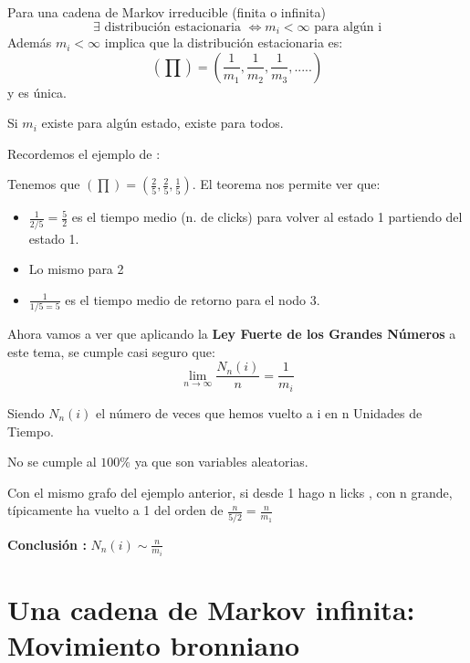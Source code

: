 	\begin{theorem}[Teorema 4]
		\label{Markov_tma4}
		Para una cadena de Markov irreducible (finita o infinita)
		$$\exists \text{ distribución estacionaria } \iff m_i <\infty \text{ para algún i}$$
		Además $m_i<\infty$ implica que la distribución estacionaria es:
		$$(\prod) = (\frac{1}{m_1}, \frac{1}{m_2},\frac{1}{m_3}, .....)$$
		y es única.
	\end{theorem}
	\obs Si $m_i$ existe para algún estado, existe para todos.

	\begin{example}
		Recordemos el ejemplo de :
			\begin{center}
				\centering
			\end{center}

		Tenemos que $(\prod) = (\frac{2}{5}, \frac{2}{5}, \frac{1}{5})$. El teorema nos permite ver que:
		\begin{itemize}
			\item $\frac{1}{2/5} = \frac{5}{2}$ es el tiempo medio (n. de clicks) para volver al estado 1 partiendo del estado 1.
			\item Lo mismo para 2
			\item $\frac{1}{1/5 = 5}$ es el tiempo medio de retorno para el nodo 3.
		\end{itemize}
	\end{example}

	Ahora vamos a ver que aplicando la \textbf{Ley Fuerte de los Grandes Números} a este tema, se cumple casi seguro que:
	$$\lim_{n \rightarrow \infty} \frac{N_n (i)}{n} = \frac{1}{m_i}$$

	Siendo $N_n (i)$ el número de veces que hemos vuelto a i en n Unidades de Tiempo.

	\obs No se cumple al $100\%$ ya que son variables aleatorias.

	\begin{example}
		Con el mismo grafo del ejemplo anterior, si desde 1 hago n licks , con n grande, típicamente ha vuelto a 1 del orden de $\frac{n}{5/2} = \frac{n}{m_1}$
	\end{example}

	\textbf{Conclusión :} $N_n (i) \sim \frac{n}{m_i}$




\section{Una cadena de Markov infinita: Movimiento bronniano}

